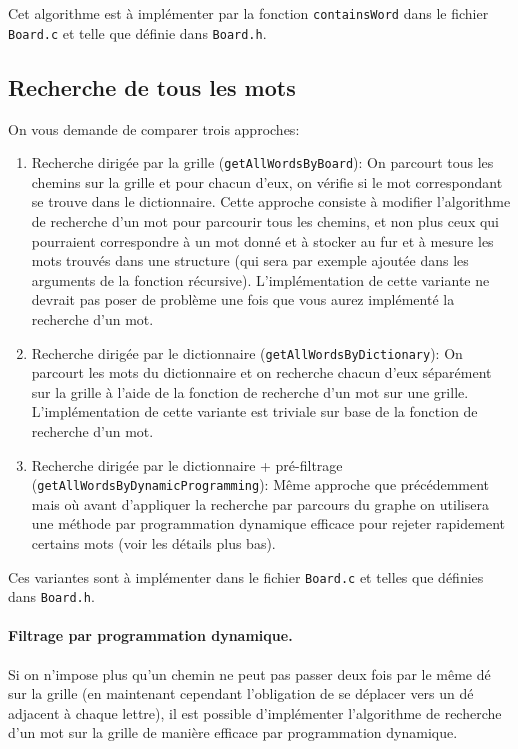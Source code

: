 \documentclass[a4paper,10pt]{article}
\begin{document}
Cet algorithme est à implémenter par la fonction \texttt{containsWord}
dans le fichier \texttt{Board.c} et telle que définie dans \texttt{Board.h}.

\subsection{Recherche de tous les mots}\label{sec:rechmot}

On vous demande de comparer trois approches:
\begin{enumerate}
\item Recherche dirigée par la grille (\texttt{getAllWordsByBoard}):
  On parcourt tous les chemins sur la grille et pour chacun d'eux, on
  vérifie si le mot correspondant se trouve dans le
  dictionnaire. Cette approche consiste à modifier l'algorithme de
  recherche d'un mot pour parcourir tous les chemins, et non plus ceux
  qui pourraient correspondre à un mot donné et à stocker au fur et à
  mesure les mots trouvés dans une structure (qui sera par exemple
  ajoutée dans les arguments de la fonction
  récursive). L'implémentation de cette variante ne devrait pas poser
  de problème une fois que vous aurez implémenté la recherche d'un
  mot.
\item Recherche dirigée par le dictionnaire
  (\texttt{getAllWordsByDictionary}): On parcourt les mots du
  dictionnaire et on recherche chacun d'eux séparément sur la grille à
  l'aide de la fonction de recherche d'un mot sur une
  grille. L'implémentation de cette variante est triviale sur base de
  la fonction de recherche d'un mot.
\item Recherche dirigée par le dictionnaire + pré-filtrage
  (\texttt{getAllWordsByDynamicProgramming}): Même approche que
  précédemment mais où avant d'appliquer la recherche par parcours du
  graphe on utilisera une méthode par programmation dynamique efficace
  pour rejeter rapidement certains mots (voir les détails plus bas).
\end{enumerate}

Ces variantes sont à implémenter dans le fichier \texttt{Board.c} et telles que
définies dans \texttt{Board.h}.


\paragraph{Filtrage par programmation dynamique.}

Si on n'impose plus qu'un chemin ne peut pas passer deux fois par le
même dé sur la grille (en maintenant cependant l'obligation de se
déplacer vers un dé adjacent à chaque lettre), il est possible
d'implémenter l'algorithme de recherche d'un mot sur la grille de
manière efficace par programmation dynamique.
\end{document}
